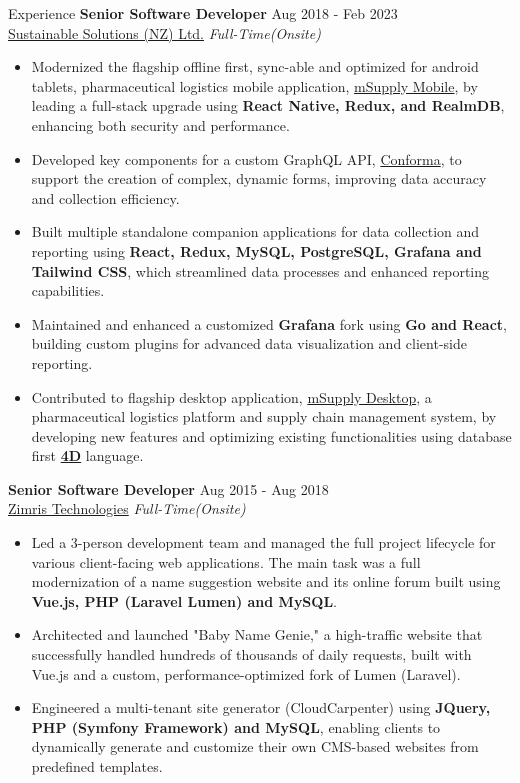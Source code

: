 \documentclass{resume} %
\begin{document}
\begin{rSection}{Experience}
\textbf{Senior Software Developer} \hfill Aug 2018 - Feb 2023 \\
\href{https://sussol.net/}{Sustainable Solutions (NZ) Ltd.} \hfill \textit{Full-Time(Onsite)}
 \begin{itemize}
    \itemsep -3pt {} 
     \item Modernized the flagship offline first, sync-able and optimized for android tablets, pharmaceutical logistics mobile application, \href{https://msupply.org.nz/mobile/}{mSupply Mobile}, by leading a full-stack upgrade using \textbf{React Native, Redux, and RealmDB}, enhancing both security and performance.
     \item Developed key components for a custom GraphQL API, \href{https://docs.conforma.nz/docs/about/introduction/}{Conforma}, to support the creation of complex, dynamic forms, improving data accuracy and collection efficiency.
     \item Built multiple standalone companion applications for data collection and reporting using \textbf{React, Redux, MySQL, PostgreSQL, Grafana and Tailwind CSS}, which streamlined data processes and enhanced reporting capabilities.
     \item Maintained and enhanced a customized \textbf{Grafana} fork using \textbf{Go and React}, building custom plugins for advanced data visualization and client-side reporting.
     \item Contributed to flagship desktop application, \href{https://msupply.org.nz/}{mSupply Desktop}, a pharmaceutical logistics platform and supply chain management system, by developing new features and optimizing existing functionalities using database first \textbf{\href{https://us.4d.com/}{4D}} language.
 \end{itemize}

\textbf{Senior Software Developer} \hfill Aug 2015 - Aug 2018 \\
\href{https://www.zimris.com/}{Zimris Technologies} \hfill \textit{Full-Time(Onsite)}
 \begin{itemize}
    \itemsep -3pt {} 
     \item Led a 3-person development team and managed the full project lifecycle for various client-facing web applications. The main task was a full modernization of a name suggestion website and its online forum built using \textbf{Vue.js, PHP (Laravel Lumen) and MySQL}.
     \item Architected and launched "Baby Name Genie," a high-traffic website that successfully handled hundreds of thousands of daily requests, built with Vue.js and a custom, performance-optimized fork of Lumen (Laravel).
     \item Engineered a multi-tenant site generator (CloudCarpenter) using \textbf{JQuery, PHP (Symfony Framework) and MySQL}, enabling clients to dynamically generate and customize their own CMS-based websites from predefined templates.
 \end{itemize}


\end{rSection}
\end{document}
